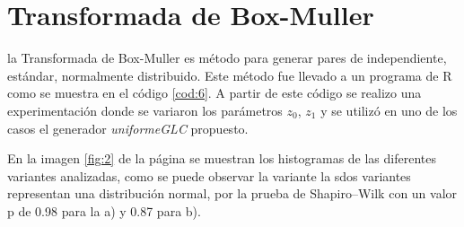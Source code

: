 \documentclass{article}
\begin{document}
\section{Transformada de Box-Muller}
la Transformada de Box-Muller es  método para generar pares de independiente, estándar, normalmente distribuido. Este método fue llevado  a un programa de R como se muestra en el código \ref{cod:6}. A partir de este código se realizo una experimentación donde se variaron los parámetros $z_{0}$, $z_{1}$ y se utilizó en uno de los casos el generador \textit{uniformeGLC} propuesto. 

\begin{center}

\label{cod:6}
\end{center}

En la imagen \ref{fig:2} de la página \pageref{fig:2}  se muestran los histogramas de las diferentes variantes analizadas, como se puede observar la variante la sdos variantes representan una distribución normal, por la prueba de Shapiro–Wilk con un valor p de 0.98 para la a) y 0.87 para b). 
\end{document}

